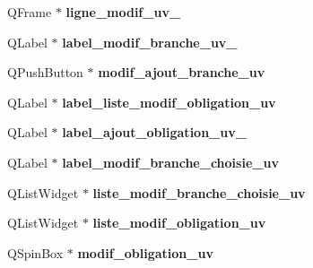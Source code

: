\begin{DoxyCompactItemize}
\item 
\hypertarget{class_ui___administration_acfcb9e92dc81e2c45f7aa0c6d980cec2}{Q\+Frame $\ast$ {\bfseries ligne\+\_\+modif\+\_\+uv\+\_}}\label{class_ui___administration_acfcb9e92dc81e2c45f7aa0c6d980cec2}

\item 
\hypertarget{class_ui___administration_a056e4c6ef19bc3bcc5734294ef621807}{Q\+Label $\ast$ {\bfseries label\+\_\+modif\+\_\+branche\+\_\+uv\+\_}}\label{class_ui___administration_a056e4c6ef19bc3bcc5734294ef621807}

\item 
\hypertarget{class_ui___administration_a98c864b9bd6317fd832f2bfb7dba50a6}{Q\+Push\+Button $\ast$ {\bfseries modif\+\_\+ajout\+\_\+branche\+\_\+uv}}\label{class_ui___administration_a98c864b9bd6317fd832f2bfb7dba50a6}

\item 
\hypertarget{class_ui___administration_a40e32177047ec3ce70412b7e70d10572}{Q\+Label $\ast$ {\bfseries label\+\_\+liste\+\_\+modif\+\_\+obligation\+\_\+uv}}\label{class_ui___administration_a40e32177047ec3ce70412b7e70d10572}

\item 
\hypertarget{class_ui___administration_a418410aa5132d47f4d523f132f1d41e5}{Q\+Label $\ast$ {\bfseries label\+\_\+ajout\+\_\+obligation\+\_\+uv\+\_}}\label{class_ui___administration_a418410aa5132d47f4d523f132f1d41e5}

\item 
\hypertarget{class_ui___administration_a71c57ce04a48c708513cdeab8c3d7000}{Q\+Label $\ast$ {\bfseries label\+\_\+modif\+\_\+branche\+\_\+choisie\+\_\+uv}}\label{class_ui___administration_a71c57ce04a48c708513cdeab8c3d7000}

\item 
\hypertarget{class_ui___administration_af6ed0548abc8d6f6193807957023d581}{Q\+List\+Widget $\ast$ {\bfseries liste\+\_\+modif\+\_\+branche\+\_\+choisie\+\_\+uv}}\label{class_ui___administration_af6ed0548abc8d6f6193807957023d581}

\item 
\hypertarget{class_ui___administration_af93a61ac269ad32a95014b7bac464cee}{Q\+List\+Widget $\ast$ {\bfseries liste\+\_\+modif\+\_\+obligation\+\_\+uv}}\label{class_ui___administration_af93a61ac269ad32a95014b7bac464cee}

\item 
\hypertarget{class_ui___administration_a8c4148aa469f57c22983381d6690ed08}{Q\+Spin\+Box $\ast$ {\bfseries modif\+\_\+obligation\+\_\+uv}}\label{class_ui___administration_a8c4148aa469f57c22983381d6690ed08}


\end{DoxyCompactItemize}
